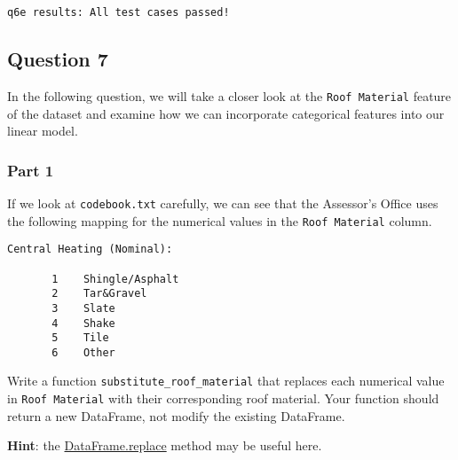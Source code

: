 \documentclass[11pt]{article}
\makeatletter
\newcommand{\boxspacing}{\kern\kvtcb@left@rule\kern\kvtcb@boxsep}
\newcommand{\prompt}[4]{
        {\ttfamily\llap{{\color{#2}[#3]:\hspace{3pt}#4}}\vspace{-\baselineskip}}
    }
\makeatother
\begin{document}
            \begin{tcolorbox}[breakable, size=fbox, boxrule=.5pt, pad at break*=1mm, opacityfill=0]
\prompt{Out}{outcolor}{40}{\boxspacing}
\begin{Verbatim}[commandchars=\\\{\}]
q6e results: All test cases passed!
\end{Verbatim}
\end{tcolorbox}
        
    \hypertarget{question-7}{%
\subsection{Question 7}\label{question-7}}

In the following question, we will take a closer look at the
\texttt{Roof\ Material} feature of the dataset and examine how we can
incorporate categorical features into our linear model.

    \hypertarget{part-1}{%
\subsubsection{Part 1}\label{part-1}}

If we look at \texttt{codebook.txt} carefully, we can see that the
Assessor's Office uses the following mapping for the numerical values in
the \texttt{Roof\ Material} column.

\begin{verbatim}
Central Heating (Nominal): 

       1    Shingle/Asphalt
       2    Tar&Gravel
       3    Slate
       4    Shake
       5    Tile
       6    Other
\end{verbatim}

Write a function \texttt{substitute\_roof\_material} that replaces each
numerical value in \texttt{Roof\ Material} with their corresponding roof
material. Your function should return a new DataFrame, not modify the
existing DataFrame.

\textbf{Hint}: the
\href{https://pandas.pydata.org/pandas-docs/stable/generated/pandas.DataFrame.replace.html}{DataFrame.replace}
method may be useful here.
\end{document}
